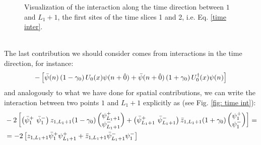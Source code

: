\begin{figure}

    \caption{Visualization of the interaction along the time direction between $1$ and $L_1 + 1$, the first sites of the time slices 1 and 2, i.e. Eq. \eqref{time inter}.}
    \label{fig: time int}
\end{figure}
\\ The last contribution we should consider comes from interactions in the time direction, for instance:
\begin{equation}
    - \left[ \Bar{\psi}(n) \left(1 - \gamma_0 \right) U_0(x) \psi(n + \hat{0}) + \Bar{\psi}(n + \hat{0}) \left(1 + \gamma_0 \right) U^\dagger_0(x) \psi(n) \right]
\end{equation}
and analogously to what we have done for spatial contributions, we can write the interaction between two points $1$ and $L_1 + 1$ explicitly as (see Fig. \eqref{fig: time int}):
\begin{equation}\label{time inter}
    \begin{split}
        &- 2 \left[ \begin{pmatrix}
        \Bar{\psi}^+_1 \,\, \Bar{\psi}^-_1
    \end{pmatrix} z_{1,L_1 + 1} (1 - \gamma_0) \begin{pmatrix}
        \psi^+_{L_1 + 1} \\
        \psi^-_{L_1 + 1}
    \end{pmatrix} + \begin{pmatrix}
        \Bar{\psi}^+_{L_1 + 1} \,\, \Bar{\psi}^-_{L_1 + 1}
    \end{pmatrix} \Bar{z}_{1,L_1 + 1} (1 + \gamma_0) \begin{pmatrix}
        \psi^+_1 \\
        \psi^-_1
    \end{pmatrix} \right] = \\
   & = -2 \left[ z_{1, L_1 + 1} \Bar{\psi}_1^+ \psi_{L_1 + 1}^+ + \Bar{z}_{1, L_1 + 1} \Bar{\psi}_{L_1 + 1}^- \psi_1^- \right]
    \end{split}
\end{equation}
